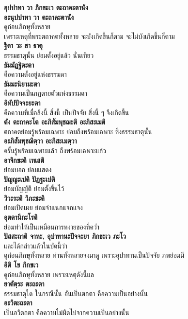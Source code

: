 \documentclass[12pt]{article}
\begin{document}
\textbf{อุปปาทา วา ภิกขะเว ตะถาคะตานัง\\
อะนุปปาทา วา ตะถาคะตานัง}\\
\indent ดูก่อนภิกษุทั้งหลาย\\
\indent เพราะเหตุที่พระตถาคตทั้งหลาย จะบังเกิดขึ้นก็ตาม จะไม่บังเกิดขึ้นก็ตาม\\
\textbf{ฐิตา วะ สา ธาตุ}\\
\indent ธรรมธาตุนั้น ย่อมตั้งอยู่แล้ว นั่นเทียว\\
\textbf{ธัมมัฏฐิตะตา}\\
\indent คือความตั้งอยู่แห่งธรรมดา\\
\textbf{ธัมมะนิยามะตา}\\
\indent คือความเป็นกฎตายตัวแห่งธรรมดา\\
\textbf{อิทัปปัจจะยะตา}\\
\indent คือความที่เมื่อสิ่งนี้ สิ่งนี้ เป็นปัจจัย สิ่งนี้ ๆ จึงเกิดขึ้น\\
\textbf{ตัง ตะถาคะโต อะภิสัมพุชฌะติ อะภิสะเมติ}\\
\indent ตถาคตย่อมรู้พร้อมเฉพาะ ย่อมถึงพร้อมเฉพาะ ซึ่งธรรมธาตุนั้น\\
\textbf{อะภิสัมพุชฌิตฺวา อะภิสะเมตฺวา}\\
\indent ครั้นรู้พร้อมเฉพาะแล้ว ถึงพร้อมเฉพาะแล้ว\\
\textbf{อาจิกขะติ เทเสติ}\\
\indent ย่อมบอก ย่อมแสดง\\
\textbf{ปัญญะเปติ ปัฏฐะเปติ}\\
\indent ย่อมบัญญัติ ย่อมตั้งขึ้นไว้\\
\textbf{วิวะระติ วิภะชะติ}\\
\indent ย่อมเปิดเผย ย่อมจำแนกแจกแจง\\
\textbf{อุตตานีกะโรติ}\\
\indent ย่อมทำให้เป็นเหมือนการหงายของที่คว่ำ\\
\textbf{ปัสสะถาติ จาหะ, อุปาทานะปัจจะยา ภิกขะเว ภะโว}\\
\indent และได้กล่าวแล้วในบัดนี้ว่า \\
\indent ดูก่อนภิกษุทั้งหลาย ท่านทั้งหลายจงมาดู เพราะอุปาทานเป็นปัจจัย ภพย่อมมี\\
\textbf{อิติ โข ภิกขเว}\\
\indent ดูก่อนภิกษุทั้งหลาย เพราะเหตุดังนี้แล\\
\textbf{ยาตัตฺระ ตะถะตา}\\
\indent ธรรมธาตุใด ในกรณีนั้น อันเป็นตถตา คือความเป็นอย่างนั้น\\
\textbf{อะวิตะถะตา}\\
\indent เป็นอวิตถตา คือความไม่ผิดไปจากความเป็นอย่างนั้น\\
\end{document}
